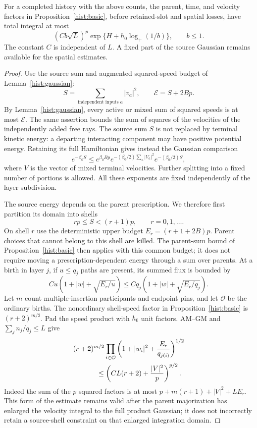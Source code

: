 \begin{lemma}\label{close:energy}
For a completed history with the above counts, the parent, time,
and velocity factors in Proposition~\ref{hist:basic}, before
retained-slot and spatial losses, have total integral at most
\begin{equation}\label{close:energy-factor}
 (C b\sqrt L)^p
 \exp\{H+h_0\log_+(1/b)\},
 \qquad b\leq1.
\end{equation}
The constant $C$ is independent of $L$. A fixed part of the source
Gaussian remains available for the spatial estimates.
\end{lemma}
\begin{proof}
Use the source sum and augmented squared-speed budget of
Lemma~\ref{hist:gaussian}:
\[
 S=\sum_{\text{independent inputs }a}|v_a|^2,
 \qquad \mathcal E=S+2Bp.
\]
By Lemma~\ref{hist:gaussian}, every active or mixed sum of
squared speeds is at most $\mathcal E$. The same assertion bounds
the sum of squares of the velocities of the independently added
free rays. The source sum $S$ is not replaced by terminal
kinetic energy: a departing interacting component may have positive
potential energy. Retaining its full Hamiltonian gives instead
the Gaussian comparison
\begin{equation}\label{close:source-gaussian}
 e^{-\beta _0S}
 \leq e^{\beta _0Bp}
 e^{-(\beta _0/2)\sum_a|V_a|^2}
 e^{-(\beta _0/2)S},
\end{equation}
where $V$ is the vector of mixed terminal velocities. Further
splitting into a fixed number of portions is allowed. All these
exponents are fixed independently of the layer subdivision.

The source energy depends on the parent prescription. We therefore
first partition its domain into shells
\[
 rp\leq S<(r+1)p,\qquad r=0,1,\ldots.
\]
On shell $r$ use the deterministic upper budget
$E_r=(r+1+2B)p$. Parent choices that cannot belong to this
shell are killed. The parent-sum bound of
Proposition~\ref{hist:basic} then applies with this common budget;
it does not require moving a prescription-dependent energy through
a sum over parents. At a birth in layer $j$, if $u\leq q_j$ paths
are present, its summed flux is bounded by
\[
 C u\left(1+|w|+\sqrt{E_r/u}\right)
 \leq Cq_j\left(1+|w|+\sqrt{E_r/q_j}\right).
\]
Let $m$ count multiple-insertion participants and endpoint pins,
and let $\mathcal O$ be the ordinary births. The nonordinary
shell-speed factor in Proposition~\ref{hist:basic} is
$(r+2)^{m/2}$. Pad the speed product with $h_0$ unit factors.
AM--GM and $\sum_jn_j/q_j\leq L$ give
\begin{align}
 &(r+2)^{m/2}
 \prod_{i\in\mathcal O}
 \left(1+|w_i|^2+\frac{E_r}{q_{j(i)}}\right)^{1/2}
 \nonumber\\
 &\hspace{12mm}\leq
 \left(C L(r+2)+\frac{|V|^2}{p}\right)^{p/2}.
 \label{close:amgm}
\end{align}
Indeed the sum of the $p$ squared factors is at most
$p+m(r+1)+|V|^2+LE_r$.
This form of the estimate remains valid after the parent
majorization has enlarged the velocity integral to the full
product Gaussian; it does not incorrectly retain a source-shell
constraint on that enlarged integration domain.


\end{proof}
